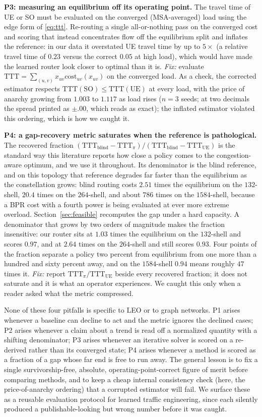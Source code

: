 \documentclass[journal]{IEEEtran}
\newcommand{\cost}{\mathrm{cost}}
\newcommand{\TTT}{\mathrm{TTT}}
\begin{document}
\textbf{P3: measuring an equilibrium off its operating point.} The travel time of UE or
SO must be evaluated on the converged (MSA-averaged) load using the edge form of
\eqref{eq:ttt}. Re-routing a single all-or-nothing pass on the converged cost and
scoring that instead concentrates flow off the equilibrium split and inflates the
reference: in our data it overstated UE travel time by up to $5\times$ (a relative
travel time of $0.23$ versus the correct $0.05$ at high load), which would have made the
learned router look closer to optimal than it is. \emph{Fix:} evaluate
$\TTT=\sum_{(u,v)} x_{uv}\cost_{uv}(x_{uv})$ on the converged load. As a check, the
corrected estimator respects $\TTT(\mathrm{SO})\le\TTT(\mathrm{UE})$ at every load, with
the price of anarchy growing from $1.003$ to $1.117$ as load rises ($n{=}3$ seeds; at two decimals the spread printed as $\pm.00$, which reads as exact); the inflated estimator
violated this ordering, which is how we caught it.

\textbf{P4: a gap-recovery metric saturates when the reference is pathological.} The recovered
fraction $(\TTT_{\mathrm{blind}}-\TTT_\pi)/(\TTT_{\mathrm{blind}}-\TTT_{\mathrm{UE}})$ is the
standard way this literature reports how close a policy comes to the congestion-aware optimum, and
we use it throughout. Its denominator is the blind reference, and on this topology that reference
degrades far faster than the equilibrium as the constellation grows: blind routing costs $2.51$
times the equilibrium on the $132$-shell, $20.4$ times on the $264$-shell, and about $786$ times on
the $1584$-shell, because a BPR cost with a fourth power is being evaluated at ever more extreme
overload. Section~\ref{sec:feasible} recomputes the gap under a hard capacity. A denominator that grows by two orders of magnitude makes the fraction insensitive: our router sits at $1.03$ times the equilibrium on the $132$-shell and scores $0.97$, and at $2.64$ times on the $264$-shell and still scores $0.93$. Four points of the fraction separate a policy two percent from equilibrium from one more than a hundred and sixty percent away, and on the $1584$-shell $0.94$ means roughly $47$ times it. \emph{Fix:} report $\TTT_\pi/\TTT_{\mathrm{UE}}$ beside every recovered fraction; it does not saturate and it is what an operator experiences. We caught this only when a reader asked what the metric compressed.

None of these four pitfalls is specific to LEO or to graph networks. P1 arises whenever a
baseline can decline to act and the metric ignores the declined cases; P2 arises whenever a
claim about a trend is read off a normalized quantity with a shifting denominator; P3 arises
whenever an iterative solver is scored on a re-derived rather than its converged state; P4 arises
whenever a method is scored as a fraction of a gap whose far end is free to run away. The
general lesson is to fix a single survivorship-free, absolute, operating-point-correct figure
of merit before comparing methods, and to keep a cheap internal consistency check (here, the
price-of-anarchy ordering) that a corrupted estimator will fail. We surface these as a
reusable evaluation protocol for learned traffic engineering, since each silently produced a
publishable-looking but wrong number before it was caught.
\end{document}
